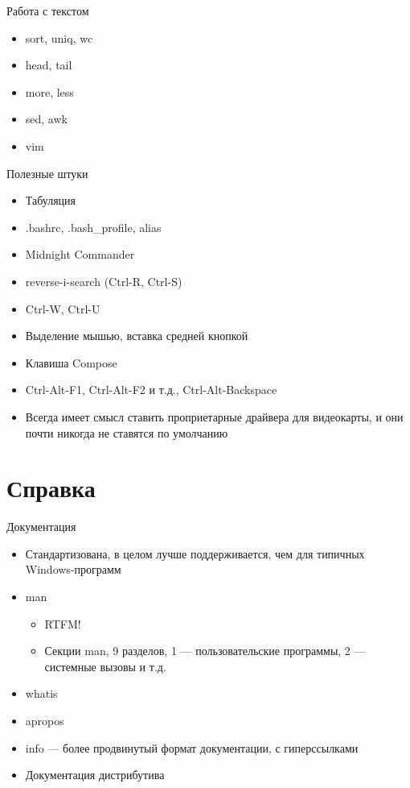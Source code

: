 \documentclass{../../slides-style}
\begin{document}
    \begin{frame}{Работа с текстом}
        \begin{itemize}
            \item sort, uniq, wc
            \item head, tail
            \item more, less
            \item sed, awk
            \item vim
        \end{itemize}
    \end{frame}

    \begin{frame}{Полезные штуки}
        \begin{itemize}
            \item Табуляция
            \item .bashrc, .bash\_profile, alias
            \item Midnight Commander
            \item reverse-i-search (Ctrl-R, Ctrl-S)
            \item Ctrl-W, Ctrl-U
            \item Выделение мышью, вставка средней кнопкой
            \item Клавиша Compose
            \item Ctrl-Alt-F1, Ctrl-Alt-F2 и т.д., Ctrl-Alt-Backspace
            \item Всегда имеет смысл ставить проприетарные драйвера для видеокарты, и они почти никогда не ставятся по умолчанию
        \end{itemize}
    \end{frame}

    \section{Справка}

    \begin{frame}{Документация}
        \begin{itemize}
            \item Стандартизована, в целом лучше поддерживается, чем для типичных Windows-программ
            \item man
            \begin{itemize}
                \item RTFM!
                \item Секции man, 9 разделов, 1 --- пользовательские программы, 2 --- системные вызовы и т.д.
            \end{itemize}
            \item whatis
            \item apropos
            \item info --- более продвинутый формат документации, с гиперссылками
            \item Документация дистрибутива
        \end{itemize}
    \end{frame}
\end{document}

